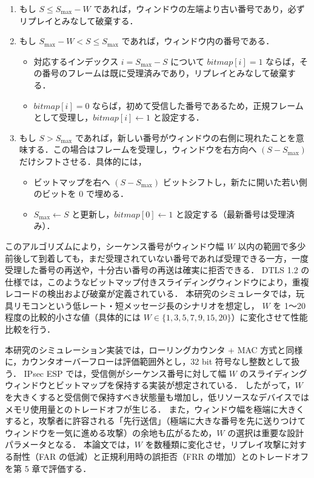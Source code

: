 \documentclass[twocolumn,10pt,a4paper]{jsarticle}
\begin{document}
\begin{enumerate}
 \item もし $S \leq S_{\max} - W$ であれば，ウィンドウの左端より古い番号であり，必ずリプレイとみなして破棄する．
 \item もし $S_{\max} - W < S \leq S_{\max}$ であれば，ウィンドウ内の番号である．
   \begin{itemize}
     \item 対応するインデックス $i = S_{\max} - S$ について $\mathit{bitmap}[i] = 1$ ならば，その番号のフレームは既に受理済みであり，リプレイとみなして破棄する．
     \item $\mathit{bitmap}[i] = 0$ ならば，初めて受信した番号であるため，正規フレームとして受理し，$\mathit{bitmap}[i] \leftarrow 1$ と設定する．
   \end{itemize}
 \item もし $S > S_{\max}$ であれば，新しい番号がウィンドウの右側に現れたことを意味する．この場合はフレームを受理し，ウィンドウを右方向へ $(S - S_{\max})$ だけシフトさせる．具体的には，
   \begin{itemize}
     \item ビットマップを右へ $(S - S_{\max})$ ビットシフトし，新たに開いた若い側のビットを 0 で埋める．
     \item $S_{\max} \leftarrow S$ と更新し，$\mathit{bitmap}[0] \leftarrow 1$ と設定する（最新番号は受理済み）．
   \end{itemize}
\end{enumerate}

このアルゴリズムにより，シーケンス番号がウィンドウ幅 $W$ 以内の範囲で多少前後して到着しても，まだ受理されていない番号であれば受理できる一方，一度受理した番号の再送や，十分古い番号の再送は確実に拒否できる．
DTLS 1.2 の仕様では，このようなビットマップ付きスライディングウィンドウにより，重複レコードの検出および破棄が定義されている\cite{RFC6347DTLS}．
本研究のシミュレータでは，玩具リモコンという低レート・短メッセージ長のシナリオを想定し，
$W$ を 1～20 程度の比較的小さな値（具体的には $W \in \{1, 3, 5, 7, 9, 15, 20\}$）に変化させて性能比較を行う．

本研究のシミュレーション実装では，ローリングカウンタ + MAC 方式と同様に，カウンタオーバーフローは評価範囲外とし，32 bit 符号なし整数として扱う．
IPsec ESP では，受信側がシーケンス番号に対して幅 $W$ のスライディングウィンドウとビットマップを保持する実装が想定されている\cite{rfc4303}．
したがって，$W$ を大きくすると受信側で保持すべき状態量も増加し，低リソースなデバイスではメモリ使用量とのトレードオフが生じる．
また，ウィンドウ幅を極端に大きくすると，攻撃者に許容される「先行送信」（極端に大きな番号を先に送りつけてウィンドウを一気に進める攻撃）の余地も広がるため，$W$ の選択は重要な設計パラメータとなる．
本論文では，$W$ を数種類に変化させ，リプレイ攻撃に対する耐性（FAR の低減）と正規利用時の誤拒否（FRR の増加）とのトレードオフを第 5 章で評価する．
\end{document}
